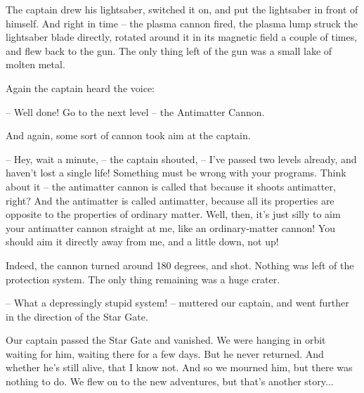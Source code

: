 \documentclass[ebook,twoside,final,openright]{memoir}
\begin{document}
The captain drew his lightsaber, switched it on, and put the lightsaber in front of himself. And right in time – the plasma cannon fired, the plasma lump struck the lightsaber blade directly, rotated around it in its magnetic field a couple of times, and flew back to the gun. The only thing left of the gun was a small lake of molten metal.\par
\par
Again the captain heard the voice:\par
– Well done! Go to the next level – the Antimatter Cannon.\par
And again, some sort of cannon took aim at the captain.\par
– Hey, wait a minute, – the captain shouted, – I’ve passed two levels already, and haven’t lost a single life! Something must be wrong with your programs. Think about it – the antimatter cannon is called that because it shoots antimatter, right? And the antimatter is called antimatter, because all its properties are opposite to the properties of ordinary matter. Well, then, it’s just silly to aim your antimatter cannon straight at me, like an ordinary-matter cannon! You should aim it directly away from me, and a little down, not up!\par
\par
Indeed, the cannon turned around 180 degrees, and shot. Nothing was left of the protection system. The only thing remaining was a huge crater.\par
– What a depressingly stupid system! – muttered our captain, and went further in the direction of the Star Gate.\par
\par
Our captain passed the Star Gate and vanished. We were hanging in orbit waiting for him, waiting there for a few days. But he never returned. And whether he’s still alive, that I know not. And so we mourned him, but there was nothing to do. We flew on to the new adventures, but that's another story...
\end{document}
